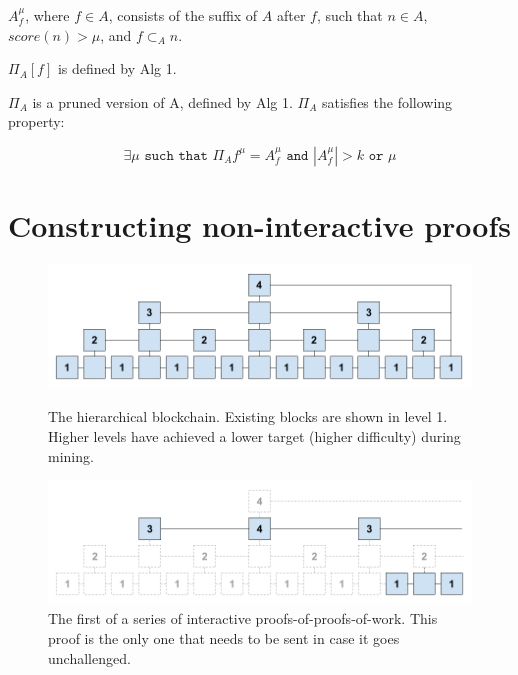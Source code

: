 \documentclass[11pt]{llncs}
\begin{document}
$A_{f}^{\mu}$, where $f \in A$, consists of the suffix of $A$ after
$f$, such that $n \in A$, $score(n) > \mu$, and $f \subset_A n$.

$\Pi_A[f]$  is defined by Alg 1.

$\Pi_{A}$ is a pruned version of A, defined by Alg 1.
$\Pi_{A}$ satisfies the following property:

\begin{equation*}
    \exists \mu \texttt{ such that } \Pi_{A}{f}^{\mu} = A_f^{\mu}
    \texttt{ and }
    |A_f^{\mu}| > k
    \texttt{ or } \mu
\end{equation*}

\section{Constructing non-interactive proofs}

\begin{figure}[h]
    \caption{The hierarchical blockchain. Existing blocks are shown in level 1.
    Higher levels have achieved a lower target (higher difficulty) during mining.}
    \centering
    \includegraphics[width=\textwidth,keepaspectratio]{figures/hierarchical-ledger.png}
    \label{fig:hierarchy}
\end{figure}

\begin{figure}[h]
    \caption{The first of a series of interactive proofs-of-proofs-of-work.
    This proof is the only one that needs to be sent in case it goes
    unchallenged.}
    \centering
    \includegraphics[width=\textwidth,keepaspectratio]{figures/interactive-popow.png}
\end{figure}
\end{document}
